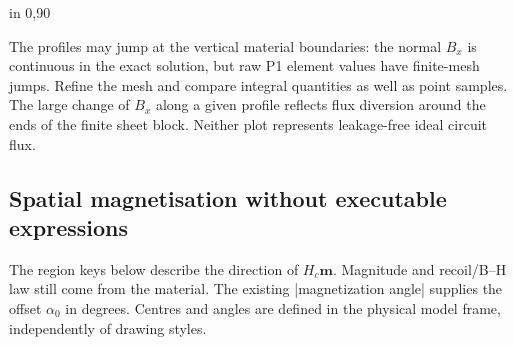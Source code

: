 \begin{codeexample}[width=0pt]
\foreach \direction in {0,90}{
  }
\end{codeexample}

\par\noindent\begin{minipage}{\linewidth}

\begin{codeexample}[width=0pt]
\end{codeexample}
\end{minipage}


The profiles may jump at the vertical material boundaries: the normal $B_x$
is continuous in the exact solution, but raw P1 element values have finite-mesh
jumps. Refine the mesh and compare integral quantities as well as point samples.
The large change of $B_x$ along a given profile reflects flux diversion around
the ends of the finite sheet block. Neither plot represents leakage-free ideal
circuit flux.

\subsection{Spatial magnetisation without executable expressions}
The region keys below describe the direction of $H_c\mathbf m$. Magnitude and
recoil/B--H law still come from the material. The existing
|magnetization angle| supplies the offset $\alpha_0$ in degrees. Centres and
angles are defined in the physical model frame, independently of drawing styles.

